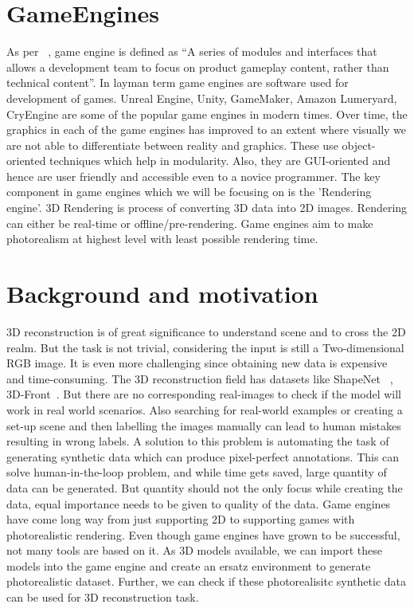 \section{GameEngines}

As per ~\cite{10.5555/983334}, game engine is defined as “A series of modules and interfaces that allows a
development team to focus on product gameplay content, rather than technical content”.
In layman term game engines are software used for development of games.
Unreal Engine, Unity, GameMaker, Amazon Lumeryard, CryEngine are some of the popular game engines in modern times.
Over time, the graphics in each of the game engines has improved to an extent where visually we are not able to differentiate between reality and graphics.
These use object-oriented techniques which help in modularity. Also, they are GUI-oriented and hence are user friendly and accessible even to a novice programmer.
The key component in game engines which we will be focusing on is the 'Rendering engine'. 3D Rendering is process of converting 3D data into 2D images.
Rendering can either be real-time or offline/pre-rendering. Game engines aim to make photorealism at highest level with least possible rendering time.


\section{Background and motivation}
3D reconstruction is of great significance to understand scene and to cross the 2D realm.
But the task is not trivial, considering the input is still a Two-dimensional RGB image.
It is even more challenging since obtaining new data is expensive and time-consuming.
The 3D reconstruction field has datasets like ShapeNet ~\cite{chang2015shapenet}, 3D-Front~\cite{Fu20203DFRONT3F}.
But there are no corresponding real-images to check if the model will work in real world scenarios.
Also searching for real-world examples or creating a set-up scene and then labelling the images manually can lead to human mistakes resulting in wrong labels.
A solution to this problem is automating the task of generating synthetic data which can produce pixel-perfect annotations.
This can solve human-in-the-loop problem, and while time gets saved, large quantity of data can be generated.
But quantity should not the only focus while creating the data, equal importance needs to be given to quality of the data.
Game engines have come long way from just supporting 2D to supporting games with photorealistic rendering.
Even though game engines have grown to be successful, not many tools are based on it. As 3D models available,
we can import these models into the game engine and create an ersatz environment to generate photorealistic dataset.
Further, we can check if these photorealisitc synthetic data can be used for 3D reconstruction task.


